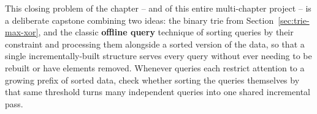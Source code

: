 \begin{takeawaybox}
This closing problem of the chapter -- and of this entire multi-chapter
project -- is a deliberate capstone combining two ideas: the binary trie
from Section~\ref{sec:trie-max-xor}, and the classic \textbf{offline
query} technique of sorting queries by their constraint and processing
them alongside a sorted version of the data, so that a single
incrementally-built structure serves every query without ever needing to
be rebuilt or have elements removed. Whenever queries each restrict
attention to a growing prefix of sorted data, check whether sorting the
queries themselves by that same threshold turns many independent queries
into one shared incremental pass.
\end{takeawaybox}

